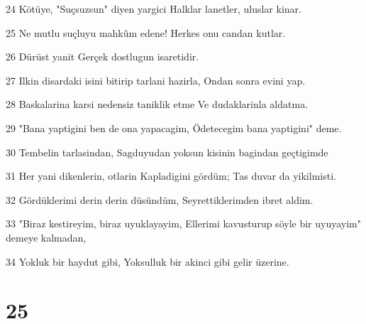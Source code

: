 \par 24 Kötüye, "Suçsuzsun" diyen yargici Halklar lanetler, uluslar kinar.
\par 25 Ne mutlu suçluyu mahkûm edene! Herkes onu candan kutlar.
\par 26 Dürüst yanit Gerçek dostlugun isaretidir.
\par 27 Ilkin disardaki isini bitirip tarlani hazirla, Ondan sonra evini yap.
\par 28 Baskalarina karsi nedensiz taniklik etme Ve dudaklarinla aldatma.
\par 29 "Bana yaptigini ben de ona yapacagim, Ödetecegim bana yaptigini" deme.
\par 30 Tembelin tarlasindan, Sagduyudan yoksun kisinin bagindan geçtigimde
\par 31 Her yani dikenlerin, otlarin Kapladigini gördüm; Tas duvar da yikilmisti.
\par 32 Gördüklerimi derin derin düsündüm, Seyrettiklerimden ibret aldim.
\par 33 "Biraz kestireyim, biraz uyuklayayim, Ellerimi kavusturup söyle bir uyuyayim" demeye kalmadan,
\par 34 Yokluk bir haydut gibi, Yoksulluk bir akinci gibi gelir üzerine.

\chapter{25}

